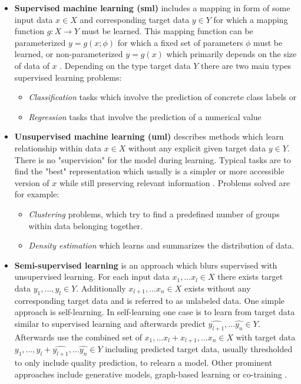\documentclass[../main.tex]{subfiles}
\begin{document}
\begin{itemize}
    \item \textbf{Supervised machine learning (\acs{sml})} includes a mapping in form of some input data $x \in X$ and corresponding target data $y \in Y$ for which a mapping function $g: X \rightarrow Y$ must be learned. This mapping function can be parameterized $y=g(x; \phi)$ for which a fixed set of parameters $\phi$ must be learned, or non-parameterized $y=g(x)$ which primarily depends on the size of data of $x$ \cite{bishop_pattern_2006}. Depending on the type target data $Y$ there are two main types supervised learning problems:
    \begin{itemize}
        \item \emph{Classification} tasks which involve the prediction of concrete class labels or
        \item \emph{Regression} tasks that involve the prediction of a numerical value
    \end{itemize}

    \item \textbf{Unsupervised machine learning (\acs{uml})} describes methods which learn relationship within data $x\in X$ without any explicit given target data $y \in Y$. There is no "supervision" for the model during learning. Typical tasks are to find the "best" representation which usually is a simpler or more accessible version of $x$ while still preserving relevant information \cite{Goodfellow-et-al-2016}. Problems solved are for example:
    \begin{itemize}
        \item \emph{Clustering} problems, which try to find a predefined number of groups within data belonging together.
        \item \emph{Density estimation} which learns and summarizes the distribution of data.
    \end{itemize}

    \item \textbf{Semi-supervised learning} is an approach which blurs supervised with unsupervised learning. For each input data $x_1, ... x_l \in X$ there exists target data $y_1, ..., y_l \in Y$. Additionally $x_{l+1},...x_n \in X$ exists without any corresponding target data and is referred to as  unlabeled data. One simple approach is self-learning. In self-learning one case is to learn from target data similar to supervised learning and afterwards predict $\hat{y_{l+1}},...\hat{y_n} \in Y$. Afterwards use the combined set of $x_1, ... x_l + x_{l+1},...x_n \in X$ with target data $y_1, ..., y_l + \hat{y_{l+1}},...\hat{y_n} \in Y$ including predicted target data, usually thresholded to only include quality prediction, to relearn a model\cite{ligthart_analyzing_2021}. Other prominent approaches include generative models, graph-based learning or co-training \cite{chapelle_semi-supervised_2006}.


\end{itemize}
\end{document}
